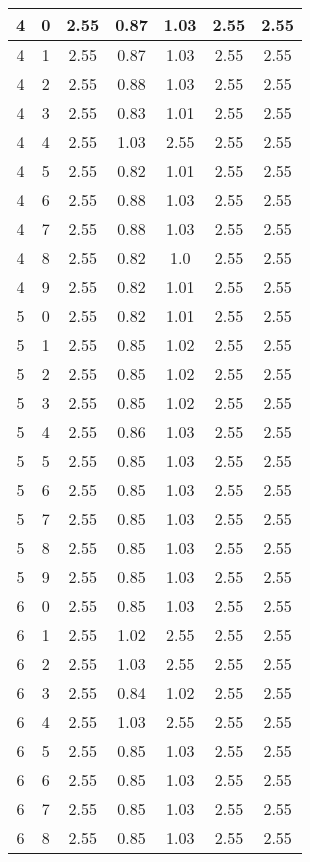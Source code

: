 \begin{longtable}{|c|c||c||c|c||c|c|}
	4 & 0 & 2.55 & 0.87 & 1.03 & 2.55 & 2.55 \\ \hline
	4 & 1 & 2.55 & 0.87 & 1.03 & 2.55 & 2.55 \\ \hline
	4 & 2 & 2.55 & 0.88 & 1.03 & 2.55 & 2.55 \\ \hline
	4 & 3 & 2.55 & 0.83 & 1.01 & 2.55 & 2.55 \\ \hline
	4 & 4 & 2.55 & 1.03 & 2.55 & 2.55 & 2.55 \\ \hline
	4 & 5 & 2.55 & 0.82 & 1.01 & 2.55 & 2.55 \\ \hline
	4 & 6 & 2.55 & 0.88 & 1.03 & 2.55 & 2.55 \\ \hline
	4 & 7 & 2.55 & 0.88 & 1.03 & 2.55 & 2.55 \\ \hline
	4 & 8 & 2.55 & 0.82 & 1.0 & 2.55 & 2.55 \\ \hline
	4 & 9 & 2.55 & 0.82 & 1.01 & 2.55 & 2.55 \\ \hline
	5 & 0 & 2.55 & 0.82 & 1.01 & 2.55 & 2.55 \\ \hline
	5 & 1 & 2.55 & 0.85 & 1.02 & 2.55 & 2.55 \\ \hline
	5 & 2 & 2.55 & 0.85 & 1.02 & 2.55 & 2.55 \\ \hline
	5 & 3 & 2.55 & 0.85 & 1.02 & 2.55 & 2.55 \\ \hline
	5 & 4 & 2.55 & 0.86 & 1.03 & 2.55 & 2.55 \\ \hline
	5 & 5 & 2.55 & 0.85 & 1.03 & 2.55 & 2.55 \\ \hline
	5 & 6 & 2.55 & 0.85 & 1.03 & 2.55 & 2.55 \\ \hline
	5 & 7 & 2.55 & 0.85 & 1.03 & 2.55 & 2.55 \\ \hline
	5 & 8 & 2.55 & 0.85 & 1.03 & 2.55 & 2.55 \\ \hline
	5 & 9 & 2.55 & 0.85 & 1.03 & 2.55 & 2.55 \\ \hline
	6 & 0 & 2.55 & 0.85 & 1.03 & 2.55 & 2.55 \\ \hline
	6 & 1 & 2.55 & 1.02 & 2.55 & 2.55 & 2.55 \\ \hline
	6 & 2 & 2.55 & 1.03 & 2.55 & 2.55 & 2.55 \\ \hline
	6 & 3 & 2.55 & 0.84 & 1.02 & 2.55 & 2.55 \\ \hline
	6 & 4 & 2.55 & 1.03 & 2.55 & 2.55 & 2.55 \\ \hline
	6 & 5 & 2.55 & 0.85 & 1.03 & 2.55 & 2.55 \\ \hline
	6 & 6 & 2.55 & 0.85 & 1.03 & 2.55 & 2.55 \\ \hline
	6 & 7 & 2.55 & 0.85 & 1.03 & 2.55 & 2.55 \\ \hline
	6 & 8 & 2.55 & 0.85 & 1.03 & 2.55 & 2.55 \\ \hline

\end{longtable}
